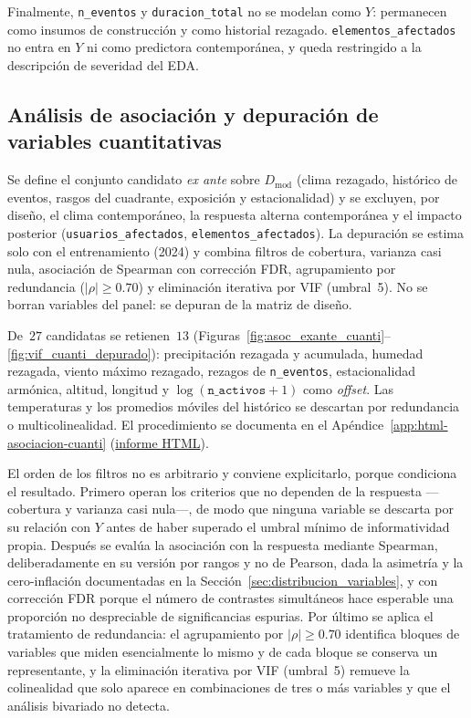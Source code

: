 Finalmente, \texttt{n\_eventos} y \texttt{duracion\_total} no se modelan como $Y$: permanecen como insumos de construcción y como historial rezagado. \texttt{elementos\_afectados} no entra en $Y$ ni como predictora contemporánea, y queda restringido a la descripción de severidad del EDA.

\subsection{Análisis de asociación y depuración de variables cuantitativas}
\label{sec:asociacion_depuracion_cuanti}
Se define el conjunto candidato \emph{ex ante} sobre $D_{\mathrm{mod}}$ (clima rezagado, histórico de eventos, rasgos del cuadrante, exposición y estacionalidad) y se excluyen, por diseño, el clima contemporáneo, la respuesta alterna contemporánea y el impacto posterior (\texttt{usuarios\_afectados}, \texttt{elementos\_afectados}). La depuración se estima solo con el entrenamiento (2024) y combina filtros de cobertura, varianza casi nula, asociación de Spearman con corrección FDR, agrupamiento por redundancia ($|\rho|\geq 0{.}70$) y eliminación iterativa por VIF (umbral~5). No se borran variables del panel: se depuran de la matriz de diseño.

De~$27$ candidatas se retienen~$13$ (Figuras~\ref{fig:asoc_exante_cuanti}--\ref{fig:vif_cuanti_depurado}): precipitación rezagada y acumulada, humedad rezagada, viento máximo rezagado, rezagos de \texttt{n\_eventos}, estacionalidad armónica, altitud, longitud y $\log(\texttt{n\_activos}+1)$ como \emph{offset}. Las temperaturas y los promedios móviles del histórico se descartan por redundancia o multicolinealidad. El procedimiento se documenta en el Apéndice~\ref{app:html-asociacion-cuanti} (\href{\urlasociaciondepuracioncuanti}{informe HTML}).

El orden de los filtros no es arbitrario y conviene explicitarlo, porque condiciona el resultado. Primero operan los criterios que no dependen de la respuesta —cobertura y varianza casi nula—, de modo que ninguna variable se descarta por su relación con $Y$ antes de haber superado el umbral mínimo de informatividad propia. Después se evalúa la asociación con la respuesta mediante Spearman, deliberadamente en su versión por rangos y no de Pearson, dada la asimetría y la cero-inflación documentadas en la Sección~\ref{sec:distribucion_variables}, y con corrección FDR porque el número de contrastes simultáneos hace esperable una proporción no despreciable de significancias espurias. Por último se aplica el tratamiento de redundancia: el agrupamiento por $|\rho|\geq 0{.}70$ identifica bloques de variables que miden esencialmente lo mismo y de cada bloque se conserva un representante, y la eliminación iterativa por VIF (umbral~5) remueve la colinealidad que solo aparece en combinaciones de tres o más variables y que el análisis bivariado no detecta.

